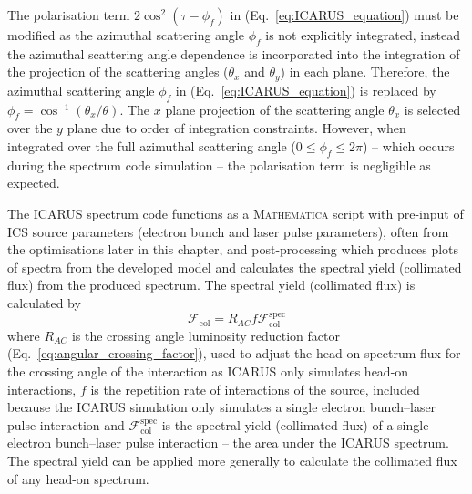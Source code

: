 \documentclass[../main.tex]{subfiles}
\begin{document}
The polarisation term $2\cos^{2}\left(\tau-\phi_{f}\right)$ in (Eq.~\ref{eq:ICARUS_equation}) must be modified as the azimuthal scattering angle $\phi_{f}$ is not explicitly integrated, instead the azimuthal scattering angle dependence is incorporated into the integration of the projection of the scattering angles ($\theta_{x}$ and $\theta_{y}$) in each plane. Therefore, the azimuthal scattering angle $\phi_{f}$ in (Eq.~\ref{eq:ICARUS_equation}) is replaced by $\phi_{f} = \cos^{-1}\left(\theta_{x}/\theta\right)$. The $x$ plane projection of the scattering angle $\theta_{x}$ is selected over the $y$ plane due to order of integration constraints. However, when integrated over the full azimuthal scattering angle ($0 \leq \phi_{f} \leq 2\pi$) -- which occurs during the spectrum code simulation -- the polarisation term is negligible as expected.

The \textsc{ICARUS} spectrum code functions as a \textsc{Mathematica} script with pre-input of ICS source parameters (electron bunch and laser pulse parameters), often from the optimisations later in this chapter, and post-processing which produces plots of spectra from the developed model and calculates the spectral yield (collimated flux) from the produced spectrum. The spectral yield (collimated flux) is calculated by 
\begin{equation}
\mathcal{F}_{\mathrm{col}} = R_{AC}f\mathcal{F}^{\mathrm{spec}}_{\mathrm{col}}    
\label{eq:spectral_yield}
\end{equation}
where $R_{AC}$ is the crossing angle luminosity reduction factor (Eq.~\ref{eq:angular_crossing_factor}), used to adjust the head-on spectrum flux for the crossing angle of the interaction as \textsc{ICARUS} only simulates head-on interactions, $f$ is the repetition rate of interactions of the source, included because the \textsc{ICARUS} simulation only simulates a single electron bunch--laser pulse interaction and $\mathcal{F}^{\mathrm{spec}}_{\mathrm{col}}$ is the spectral yield (collimated flux) of a single electron bunch--laser pulse interaction -- the area under the \textsc{ICARUS} spectrum. The spectral yield can be applied more generally to calculate the collimated flux of any head-on spectrum. 
\end{document}
